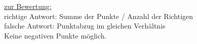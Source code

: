 {\tiny
	\underline{zur Bewertung:}\\
	richtige Antwort: Summe der Punkte / Anzahl der Richtigen\\
	falsche Antwort: Punktabzug im gleichen Verhältnis\\
	
	Keine negativen Punkte möglich.
}